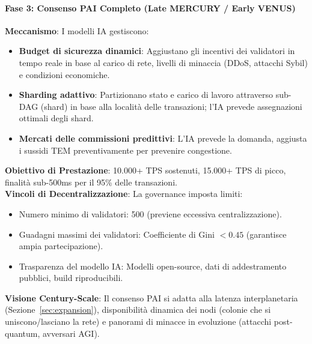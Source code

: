 \documentclass[11pt]{article}
\begin{document}
\paragraph{Fase 3: Consenso PAI Completo (Late MERCURY / Early VENUS)}
\textbf{Meccanismo}: I modelli IA gestiscono:
\begin{itemize}[noitemsep]
  \item \textbf{Budget di sicurezza dinamici}: Aggiustano gli incentivi dei validatori in tempo reale in base al carico di rete, livelli di minaccia (DDoS, attacchi Sybil) e condizioni economiche.
  \item \textbf{Sharding adattivo}: Partizionano stato e carico di lavoro attraverso sub-DAG (shard) in base alla località delle transazioni; l'IA prevede assegnazioni ottimali degli shard.
  \item \textbf{Mercati delle commissioni predittivi}: L'IA prevede la domanda, aggiusta i sussidi TEM preventivamente per prevenire congestione.
\end{itemize}
\textbf{Obiettivo di Prestazione}: 10.000+ TPS sostenuti, 15.000+ TPS di picco, finalità sub-500ms per il 95\% delle transazioni.\\
\textbf{Vincoli di Decentralizzazione}: La governance imposta limiti:
\begin{itemize}[noitemsep]
  \item Numero minimo di validatori: 500 (previene eccessiva centralizzazione).
  \item Guadagni massimi dei validatori: Coefficiente di Gini $<0.45$ (garantisce ampia partecipazione).
  \item Trasparenza del modello IA: Modelli open-source, dati di addestramento pubblici, build riproducibili.
\end{itemize}
\textbf{Visione Century-Scale}: Il consenso PAI si adatta alla latenza interplanetaria (Sezione~\ref{sec:expansion}), disponibilità dinamica dei nodi (colonie che si uniscono/lasciano la rete) e panorami di minacce in evoluzione (attacchi post-quantum, avversari AGI).
\end{document}
